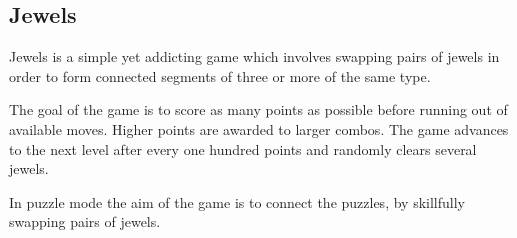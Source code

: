 \subsection{Jewels}

Jewels is a simple yet addicting game which involves swapping
pairs of jewels in order to form connected segments of three
or more of the same type.

The goal of the game is to score as many points as possible
before running out of available moves. Higher points are
awarded to larger combos. The game advances to the next level
after every one hundred points and randomly clears several jewels.

In puzzle mode the aim of the game is to connect the puzzles, by
skillfully swapping pairs of jewels.

